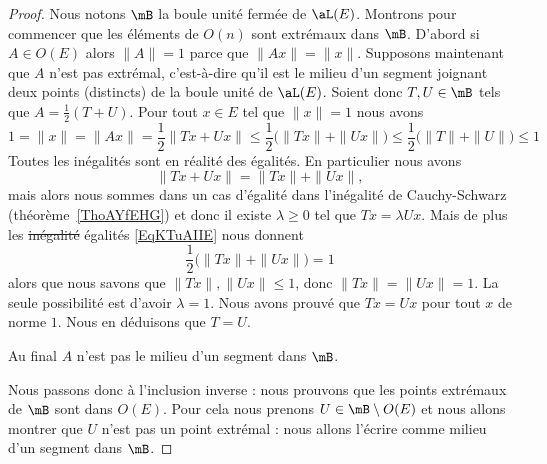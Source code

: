 \begin{proof}
	Nous notons \( \mB\) la boule unité fermée de \( \aL(E)\). Montrons pour commencer que les éléments de \( O(n)\) sont extrémaux dans \( \mB\). D'abord si \( A\in O(E)\) alors \( \| A \|=1\) parce que \( \| Ax \|=\| x \|\). Supposons maintenant que \( A\) n'est pas extrémal, c'est-à-dire qu'il est le milieu d'un segment joignant deux points (distincts) de la boule unité de \( \aL(E)\). Soient donc \( T,U\in\mB\) tels que \( A=\frac{ 1 }{2}(T+U)\). Pour tout \( x\in E\) tel que \( \| x \|=1\) nous avons
	\begin{equation}    \label{EqKTuAIIE}
		1=\| x \|=\| Ax \|=\frac{ 1 }{2}\| Tx+Ux \|\leq \frac{ 1 }{2}\big( \| Tx \|+\| Ux \| \big)\leq\frac{ 1 }{2}\big( \| T \|+\| U \| \big)\leq 1
	\end{equation}
	Toutes les inégalités sont en réalité des égalités. En particulier nous avons
	\begin{equation}
		\| Tx+Ux \|=\| Tx \|+\| Ux \|,
	\end{equation}
	mais alors nous sommes dans un cas d'égalité dans l'inégalité de Cauchy-Schwarz (théorème~\ref{ThoAYfEHG}) et donc il existe \( \lambda\geq 0\) tel que \( Tx=\lambda Ux\). Mais de plus les \sout{inégalité} égalités \eqref{EqKTuAIIE} nous donnent
	\begin{equation}
		\frac{ 1 }{2}\big( \| Tx \|+\| Ux \| \big)=1
	\end{equation}
	alors que nous savons que \( \| Tx \|,\| Ux \|\leq 1\), donc \( \| Tx \|=\| Ux \|=1\). La seule possibilité est d'avoir \( \lambda=1\). Nous avons prouvé que \( Tx=Ux\) pour tout \( x\) de norme \( 1\). Nous en déduisons que \( T=U\).

	Au final \( A\) n'est pas le milieu d'un segment dans \( \mB\).

	Nous passons donc à l'inclusion inverse : nous prouvons que les points extrémaux de \( \mB\) sont dans \( O(E)\). Pour cela nous prenons \( U\in\mB\setminus O(E)\) et nous allons montrer que \( U\) n'est pas un point extrémal : nous allons l'écrire comme milieu d'un segment dans \( \mB\).


\end{proof}
